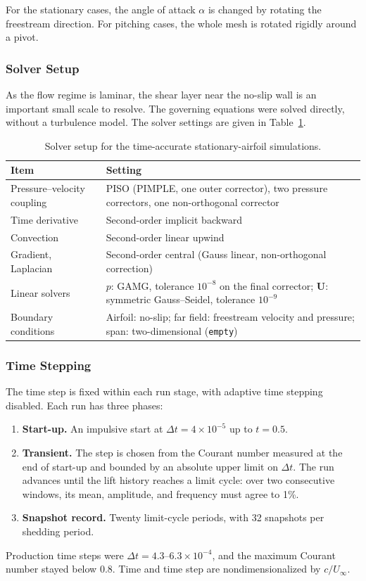 For the stationary cases, the angle of attack $\alpha$ is changed by rotating the freestream direction. For pitching cases, the whole mesh is rotated rigidly around a pivot.

\subsubsection{Solver Setup}
As the flow regime is laminar, the shear layer near the no-slip wall is an important small scale to resolve. The governing equations were solved directly, without a turbulence model. The solver settings are given in Table~\ref{tab:static_solver}.

\begin{table}[htbp]\centering\small
\caption{Solver setup for the time-accurate stationary-airfoil simulations.}\label{tab:static_solver}
\begin{tabularx}{\linewidth}{@{}>{\raggedright\arraybackslash}p{.28\linewidth}X@{}}
\toprule Item & Setting \\
\midrule
Pressure--velocity coupling & PISO (PIMPLE, one outer corrector), two pressure correctors, one non-orthogonal corrector \\
Time derivative & Second-order implicit backward \\
Convection & Second-order linear upwind \\
Gradient, Laplacian & Second-order central (Gauss linear, non-orthogonal correction) \\
Linear solvers & $p$: GAMG, tolerance $10^{-8}$ on the final corrector; $\mathbf{U}$: symmetric Gauss--Seidel, tolerance $10^{-9}$ \\
Boundary conditions & Airfoil: no-slip; far field: freestream velocity and pressure; span: two-dimensional (\texttt{empty}) \\
\bottomrule
\end{tabularx}
\end{table}

\subsubsection{Time Stepping}
The time step is fixed within each run stage, with adaptive time stepping disabled. Each run has three phases:
\begin{enumerate}
\item \textbf{Start-up.} An impulsive start at $\Delta t=4\times10^{-5}$ up to $t=0.5$.
\item \textbf{Transient.} The step is chosen from the Courant number measured at the end of start-up and bounded by an absolute upper limit on $\Delta t$. The run advances until the lift history reaches a limit cycle: over two consecutive windows, its mean, amplitude, and frequency must agree to 1\%.
\item \textbf{Snapshot record.} Twenty limit-cycle periods, with 32 snapshots per shedding period.
\end{enumerate}
Production time steps were $\Delta t=4.3$--$6.3\times10^{-4}$, and the maximum Courant number stayed below 0.8. Time and time step are nondimensionalized by $c/U_\infty$.

